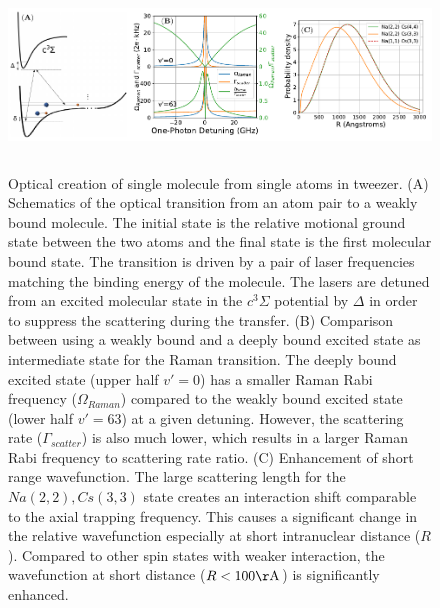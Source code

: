 \documentclass[aps,prl,twocolumn,groupedaddress]{revtex4-1}
\begin{document}
\begin{figure}
  \includegraphics[height=5cm]{fig1.pdf}
  \caption{Optical creation of single molecule from single atoms in tweezer.
    (A) Schematics of the optical transition from an atom pair to a weakly bound molecule.
    The initial state is the relative motional ground state between the two atoms
    and the final state is the first molecular bound state.
    The transition is driven by a pair of laser frequencies matching the binding energy
    of the molecule.
    The lasers are detuned from an excited molecular state in the $c^3\Sigma$ potential
    by $\Delta$ in order to suppress the scattering during the transfer.
    (B) Comparison between using a weakly bound and a deeply bound excited state
    as intermediate state for the Raman transition.
    The deeply bound excited state (upper half $v'=0$) has a smaller Raman Rabi frequency ($\Omega_{Raman}$)
    compared to the weakly bound excited state (lower half $v'=63$) at a given detuning.
    However, the scattering rate ($\Gamma_{scatter}$) is also much lower,
    which results in a larger Raman Rabi frequency to scattering rate ratio.
    (C) Enhancement of short range wavefunction.
    The large scattering length for the $Na(2,2),Cs(3,3)$ state creates an interaction shift
    comparable to the axial trapping frequency.
    This causes a significant change in the relative wavefunction especially at short
    intranuclear distance ($R$).
    Compared to other spin states with weaker interaction,
    the wavefunction at short distance ($R<100\mathrm{\AA}$) is significantly enhanced.
    \label{f-theory}
  }
\end{figure}





\end{document}
